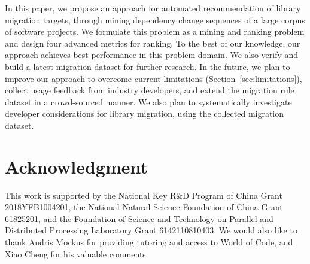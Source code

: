 \documentclass[conference, 10pt]{IEEEtran}
\begin{document}
In this paper, we propose an approach for automated recommendation of library migration targets, through mining dependency change sequences of a large corpus of software projects.
We formulate this problem as a mining and ranking problem and design four advanced metrics for ranking.
To the best of our knowledge, our approach achieves best performance in this problem domain.
We also verify and build a latest migration dataset for further research.
In the future, we plan to improve our approach to overcome current limitations (Section~\ref{sec:limitations}), collect usage feedback from industry developers, and extend the migration rule dataset in a crowd-sourced manner. We also plan to systematically investigate developer considerations for library migration, using the collected migration dataset.

\section*{Acknowledgment}

This work is supported by the National Key R\&D Program of China Grant 2018YFB1004201, the National Natural Science Foundation of China Grant 61825201, and the Foundation of Science and Technology on Parallel and Distributed Processing Laboratory Grant 6142110810403.
We would also like to thank Audris Mockus for providing tutoring and access to World of Code, and Xiao Cheng for his valuable comments.



\end{document}
